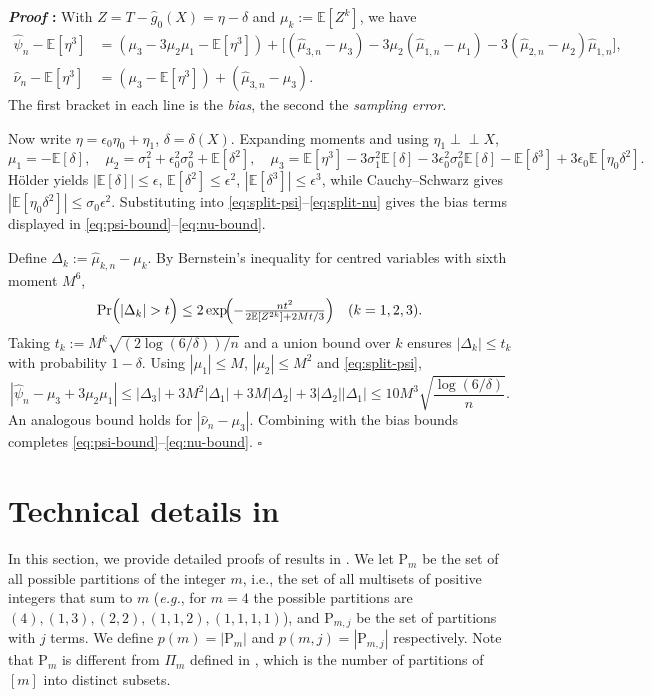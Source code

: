 \documentclass{article}
\def\eps{{\epsilon}}
\newcommand{\E}{\mathbb{E}}
\def\indep{\perp\!\!\!\perp} %
\renewenvironment{proof}{\noindent\textbf{\textit{Proof }:}}{\hfill$\square$}
\begin{document}
\begin{proof}
With $Z=T-\hat g_0(X)=\eta-\delta$ and $\mu_k:=\E[Z^{k}]$, we have
\begin{align}
\hat\psi_{n}-\E[\eta^{3}]
&=(\mu_{3}-3\mu_{2}\mu_{1}-\E[\eta^{3}])+\bigl[(\hat\mu_{3,n}-\mu_{3})-3\mu_{2}(\hat\mu_{1,n}-\mu_{1})-3(\hat\mu_{2,n}-\mu_{2})\hat\mu_{1,n}\bigr],\label{eq:split-psi}\\
\hat\nu_{n}-\E[\eta^{3}]
&=(\mu_{3}-\E[\eta^{3}])+(\hat\mu_{3,n}-\mu_{3}).\label{eq:split-nu}
\end{align}
The first bracket in each line is the \emph{bias}, the second the \emph{sampling error}.

Now write $\eta=\eps_{0}\eta_{0}+\eta_{1}$, $\delta=\delta(X)$.  Expanding moments and using $\eta_{1}\indep X$,
\[
\mu_{1}=-\E[\delta],\quad
\mu_{2}=\sigma_{1}^{2}+\eps_{0}^{2}\sigma_{0}^{2}+\E[\delta^{2}],\quad
\mu_{3}=\E[\eta^{3}]-3\sigma_{1}^{2}\E[\delta]-3\eps_{0}^{2}\sigma_{0}^{2}\E[\delta]-\E[\delta^{3}]
+3\eps_{0}\E[\eta_{0}\delta^{2}].
\]
Hölder yields $|\E[\delta]|\le\eps$, $\E[\delta^{2}]\le\eps^{2}$, $|\E[\delta^{3}]|\le\eps^{3}$, while Cauchy–Schwarz gives $|\E[\eta_{0}\delta^{2}]|\le\sigma_{0}\eps^{2}\!. $
Substituting into \eqref{eq:split-psi}–\eqref{eq:split-nu} gives the bias terms displayed in \eqref{eq:psi-bound}–\eqref{eq:nu-bound}.

Define $\Delta_{k}:=\hat\mu_{k,n}-\mu_{k}$.  By Bernstein’s inequality for centred variables with sixth moment $M^{6}$,
\[
\Pr\Bigl(|\Delta_{k}|>t\Bigr)\le2\exp\!\Bigl(-\tfrac{nt^{2}}{2\E[Z^{2k}]+2Mt/3}\Bigr)\quad(k=1,2,3).
\]
Taking $t_{k}:=M^{k}\sqrt{(2\log(6/\delta))/n}$ and a union bound over $k$ ensures $|\Delta_{k}|\le t_{k}$ with probability $1-\delta$.  Using $|\mu_{1}|\le M$, $|\mu_{2}|\le M^{2}$ and \eqref{eq:split-psi},
\[
|\hat\psi_{n}-\mu_{3}+3\mu_{2}\mu_{1}|
\le|\Delta_{3}|+3M^{2}|\Delta_{1}|+3M|\Delta_{2}|+3|\Delta_{2}||\Delta_{1}|
\le10M^{3}\sqrt{\frac{\log(6/\delta)}{n}}.
\]
An analogous bound holds for $|\hat\nu_{n}-\mu_{3}|$.  Combining with the bias bounds completes \eqref{eq:psi-bound}–\eqref{eq:nu-bound}.
\end{proof}


\section{Technical details in }

In this section, we provide detailed proofs of results in . We let  $\mathrm{P}_{m}$ be the set of all possible partitions of the integer $m$, i.e., the set of all multisets of positive integers that sum to $m$ (\emph{e.g.}, for $m=4$ the possible partitions are $(4), (1,3), (2,2), (1,1,2), (1,1,1,1)$), and $\mathrm{P}_{m,j}$ be the set of partitions with $j$ terms. We define $p(m)=|\mathrm{P}_m|$ and $p(m,j)=|\mathrm{P}_{m,j}|$ respectively. Note that $\mathrm{P}_m$ is different from $\Pi_m$ defined in , which is the number of partitions of $[m]$ into distinct subsets.
\end{document}
